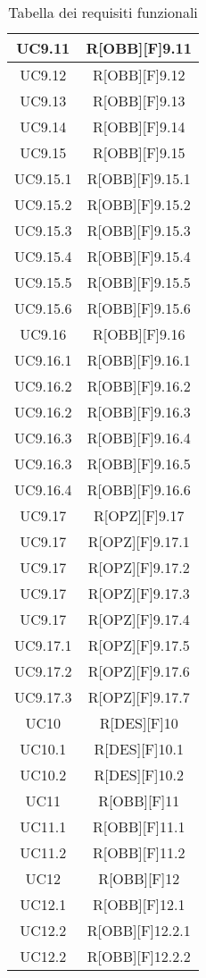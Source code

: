 	\begin{table}[h]
		\centering
		\begin{tabular}{|c|c|}
			\midrule

			UC9.11 & R[OBB][F]9.11 \\ \midrule
			UC9.12 & R[OBB][F]9.12 \\ \midrule
			UC9.13 & R[OBB][F]9.13 \\ \midrule
			UC9.14 & R[OBB][F]9.14 \\ \midrule
			UC9.15 & R[OBB][F]9.15 \\ \midrule
			UC9.15.1 & R[OBB][F]9.15.1 \\ \midrule
			UC9.15.2 & R[OBB][F]9.15.2 \\ \midrule
			UC9.15.3 & R[OBB][F]9.15.3 \\ \midrule
			UC9.15.4 & R[OBB][F]9.15.4 \\ \midrule
			UC9.15.5 & R[OBB][F]9.15.5 \\ \midrule
			UC9.15.6 & R[OBB][F]9.15.6 \\ \midrule
			UC9.16 & R[OBB][F]9.16 \\ \midrule
			UC9.16.1 & R[OBB][F]9.16.1 \\ \midrule
			UC9.16.2 & R[OBB][F]9.16.2 \\ \midrule
			UC9.16.2 & R[OBB][F]9.16.3 \\ \midrule
			UC9.16.3 & R[OBB][F]9.16.4 \\ \midrule
			UC9.16.3 & R[OBB][F]9.16.5 \\ \midrule
			UC9.16.4 & R[OBB][F]9.16.6 \\ \midrule
			UC9.17 & R[OPZ][F]9.17 \\ \midrule
			UC9.17 & R[OPZ][F]9.17.1 \\ \midrule
			UC9.17 & R[OPZ][F]9.17.2 \\ \midrule
			UC9.17 & R[OPZ][F]9.17.3 \\ \midrule
			UC9.17 & R[OPZ][F]9.17.4 \\ \midrule
			UC9.17.1 & R[OPZ][F]9.17.5 \\ \midrule
			UC9.17.2 & R[OPZ][F]9.17.6 \\ \midrule
			UC9.17.3 & R[OPZ][F]9.17.7 \\ \midrule			
			UC10 & R[DES][F]10 \\ \midrule			
			UC10.1 & R[DES][F]10.1 \\ \midrule
			UC10.2 & R[DES][F]10.2 \\ \midrule
			UC11 & R[OBB][F]11 \\ \midrule
			UC11.1 & R[OBB][F]11.1 \\ \midrule
			UC11.2 & R[OBB][F]11.2 \\ \midrule
			UC12 & R[OBB][F]12 \\ \midrule
			UC12.1 & R[OBB][F]12.1 \\ \midrule
			UC12.2 & R[OBB][F]12.2.1 \\ \midrule
			UC12.2 & R[OBB][F]12.2.2 \\ \midrule

		\end{tabular}
		\caption{Tabella dei requisiti funzionali}
	\end{table}
	\newpage

